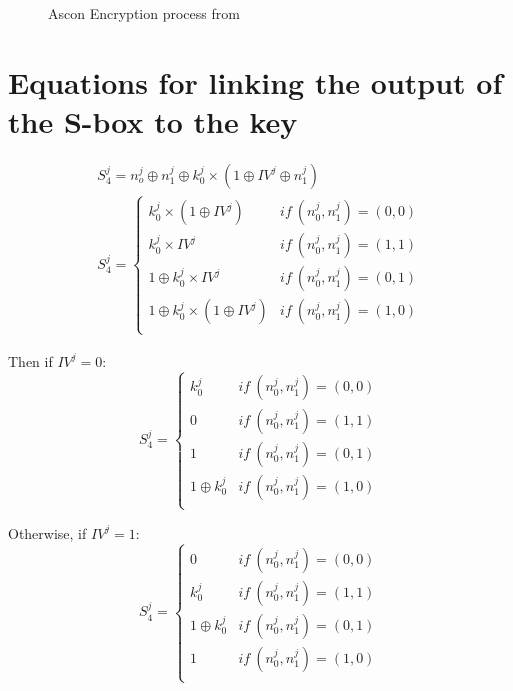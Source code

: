 \documentclass[11pt,technote]{IEEEtran}
\begin{document}
	\begin{figure}[H]
		\centering
		
		\caption{Ascon Encryption process from \cite{cours_crypto}}
		\label{fig:enc}
	\end{figure}
	
	
	\section{Equations for linking the output of the S-box to the key} \label{equations}
	\begin{gather*}
		S_4^j = n_o^j \oplus n_1^j \oplus k_0^j \times (1 \oplus IV^j \oplus n_1^j)\\
		S _4^j =\left \{	
		\begin{array}{ll}
			k_0^j \times (1 \oplus IV^j) & if\ (n_0^j,n_1^j)=(0,0)\\
			k_0^j \times IV^j & if\ (n_0^j,n_1^j)=(1,1)\\
			1 \oplus k_0^j \times IV^j & if\ (n_0^j,n_1^j)=(0,1)\\
			1 \oplus k_0^j \times (1 \oplus IV^j) & if\ (n_0^j,n_1^j)=(1,0)\\
		\end{array}
		\right.
	\end{gather*}
	
	\noindent Then if $IV^j = 0$: 
	$$S _4^j =\left \{	
	\begin{array}{ll}
		k_0^j& if\ (n_0^j,n_1^j)=(0,0)\\
		0& if\ (n_0^j,n_1^j)=(1,1)\\
		1& if\ (n_0^j,n_1^j)=(0,1)\\
		1 \oplus k_0^j& if\ (n_0^j,n_1^j)=(1,0)\\
	\end{array}
	\right.$$
	
	\noindent Otherwise, if $IV^j = 1$:
	$$S _4^j =\left \{	
	\begin{array}{ll}
		0& if\ (n_0^j,n_1^j)=(0,0)\\
		k_0^j& if\ (n_0^j,n_1^j)=(1,1)\\
		1 \oplus k_0^j& if\ (n_0^j,n_1^j)=(0,1)\\
		1& if\ (n_0^j,n_1^j)=(1,0)\\
	\end{array}
	\right.$$
	
	
\end{document}
